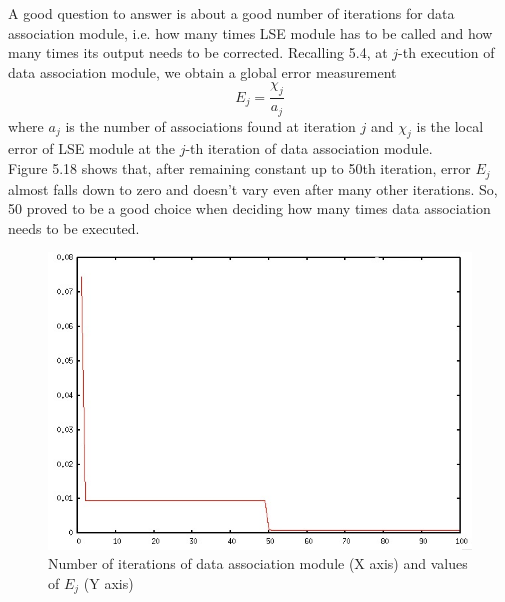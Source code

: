 \documentclass[a4paper, onecolumn]{report}
\begin{document}
A good question to answer is about a good number of iterations for data association module, i.e. how many times LSE module has to be called and how many times its output needs to be corrected. 
Recalling 5.4, at $j$-th execution of data association module, we obtain a global error measurement
\begin{equation}
	E_j = \frac{\chi_{j}}{a_j}
\end{equation}
where $a_j$ is the number of associations found at iteration $j$ and $\chi_{j}$ is the local error of LSE module at the $j$-th iteration of data association module. \\
Figure 5.18 shows that, after remaining constant up to 50th iteration, error $E_j$ almost falls down to zero and doesn't vary even after many other iterations. So, 50 proved to be a good choice when deciding how many times data association needs to be executed. 
\begin{figure}[htbp]
\centering
\includegraphics[width=1.0\textwidth]{images/chi.jpeg}
\caption{Number of iterations of data association module (X axis) and values of $E_j$ (Y axis)}
\end{figure}


\listoffigures
\listoftables
\end{document}
